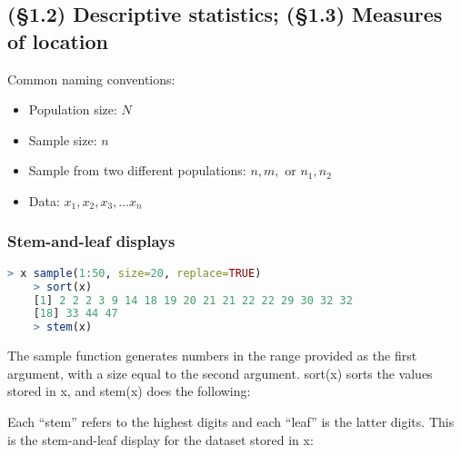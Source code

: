 \documentclass[../Notes.tex]{subfiles}
\begin{document}
    

    \subsection*{(\S 1.2) Descriptive statistics; (\S 1.3) Measures of location}

    Common naming conventions:
    \begin{itemize}
        \item Population size: $N$
        \item Sample size: $n$
        \item Sample from two different populations: $n, m,$ or $n_1, n_2$
        \item Data: $x_1, x_2, x_3, \dots x_n$
    \end{itemize}

    \subsubsection{Stem-and-leaf displays}

\begin{lstlisting}[language=R]
    > x sample(1:50, size=20, replace=TRUE)
    > sort(x)
    [1] 2 2 2 3 9 14 18 19 20 21 21 22 22 29 30 32 32
    [18] 33 44 47
    > stem(x)
\end{lstlisting}

    The sample function generates numbers in the range provided as the first argument, with a size equal to the second argument. sort(x) sorts the values stored in x, and stem(x) does the following:

    Each ``stem'' refers to the highest digits and each ``leaf'' is the latter digits. This is the stem-and-leaf display for the dataset stored in x:

    \begin{center}
    \end{center}
\end{document}
